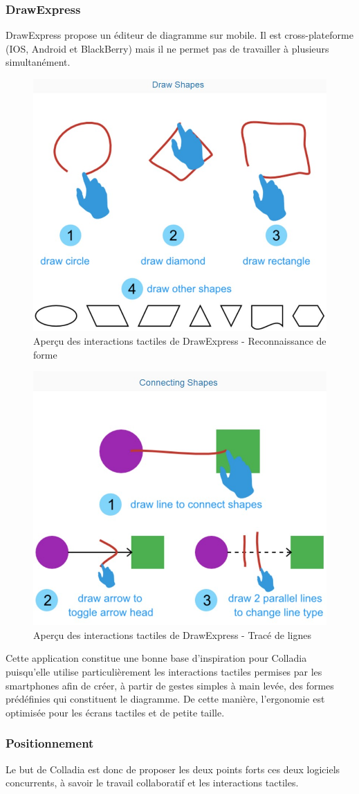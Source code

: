 \subsubsection{DrawExpress}
DrawExpress propose un éditeur de diagramme sur mobile.
Il est cross-plateforme (IOS, Android et BlackBerry) mais il ne permet pas de travailler à plusieurs simultanément.

\vspace*{\fill}
\begin{figure}[!h]
	\centering
	\includegraphics[width=.4\textwidth]{img/DrawExpressRecognition}
	\caption{Aperçu des interactions tactiles de DrawExpress - Reconnaissance de forme}
\end{figure}
\vspace*{\fill}

\newpage
\begin{figure}[!h]
	\centering
	\includegraphics[width=.4\textwidth]{img/DrawExpressLinks}
	\caption{Aperçu des interactions tactiles de DrawExpress - Tracé de lignes}
\end{figure}

Cette application constitue une bonne base d'inspiration pour Colladia puisqu'elle utilise particulièrement les interactions tactiles permises par les smartphones afin de créer, à partir de gestes simples à main levée, des formes prédéfinies qui constituent le diagramme.
De cette manière, l'ergonomie est optimisée pour les écrans tactiles et de petite taille.

\subsubsection{Positionnement}
Le but de Colladia est donc de proposer les deux points forts ces deux logiciels concurrents, à savoir le travail collaboratif et les interactions tactiles.

